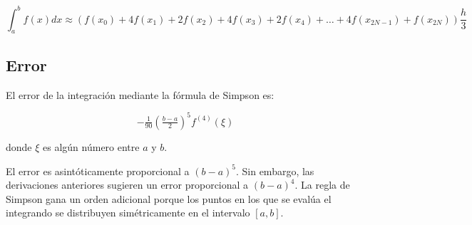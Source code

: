 $$\int_a^bf(x)dx\approx \left(f(x_0)+4f(x_1)+2f(x_2)+4f(x_3)+2f(x_4)+\ldots+4f(x_{2N-1})+f(x_{2N}) \right)\frac{h}{3}$$ 

\subsection{Error}

El error de la  integración mediante la fórmula de Simpson es:

$$ -\tfrac{1}{90} \left(\tfrac{b-a}{2}\right)^5 f^{(4)}(\xi)$$

donde $\xi$ es algún número entre $a$ y $b$.

El error es asintóticamente proporcional a $(b-a)^5$. Sin embargo, las derivaciones anteriores sugieren un error proporcional a $(b-a)^4$. La regla de Simpson gana un orden adicional porque los puntos en los que se evalúa el integrando se distribuyen simétricamente en el intervalo $[a, b]$.